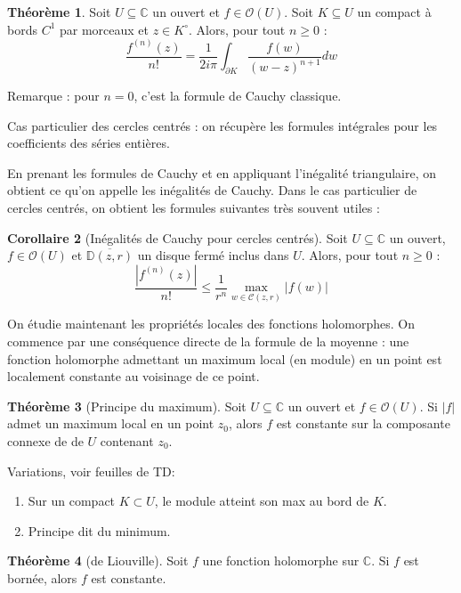 \documentclass[11pt,a4paper]{book}
\newcommand{\C}{\mathbb{C}}
\theoremstyle{definition}
\newtheorem{theoreme}{Th\'eor\`eme}[section]
\newtheorem{corollaire}[theoreme]{Corollaire}
\theoremstyle{plain}
\begin{document}
\begin{theoreme}
Soit $U\subseteq \C$ un ouvert et $f\in \mathcal O(U)$.
Soit $K\subseteq U$ un compact à bords $C^1$ par morceaux et $z\in K^\circ$.
Alors, pour tout $n\geq 0$ :
\[ \frac{f^{(n)}(z)}{n!} = \frac{1}{2i\pi} \int_{\partial K} \frac{f(w)}{(w-z)^{n+1}}dw\]
\end{theoreme}
Remarque : pour $n=0$, c'est la formule de Cauchy classique.

 Cas particulier des cercles centrés : on récupère les formules intégrales pour les coefficients des séries entières.
 
 En prenant les formules de Cauchy et en appliquant l'inégalité triangulaire, on obtient ce qu'on appelle les inégalités de Cauchy.
 Dans le cas particulier de cercles centrés, on obtient les formules suivantes très souvent utiles :
 
\begin{corollaire}[Inégalités de Cauchy pour cercles centrés]
Soit $U\subseteq \C$ un ouvert,  $f\in \mathcal O(U)$ et $\overline{\mathbb D(z,r)}$ un disque fermé inclus dans $U$.
Alors,  pour tout $n\geq 0$ :
\[ \frac{\left|f^{(n)}(z)\right|}{n!} \leq \frac{1}{r^n} \max_{w\in \mathcal C(z,r)} |f(w)|\]
\end{corollaire}
 

On étudie maintenant les propriétés locales des fonctions holomorphes.
On commence par une conséquence directe de la formule de la moyenne : une fonction holomorphe admettant un maximum local (en module) en un point est localement constante au voisinage de ce point.
 
\begin{theoreme}[Principe du maximum]
Soit $U\subseteq \C$ un ouvert et $f \in \mathcal O(U)$.
Si $|f|$ admet un maximum local en un point $z_0$, alors $f$ est constante sur la composante connexe de de $U$ contenant $z_0$.
\end{theoreme}

Variations, voir feuilles de TD:
\begin{enumerate}
\item Sur un compact $K\subset U$, le module atteint son max au bord de $K$.
\item Principe dit \og du minimum\fg.
\end{enumerate}
 
 \begin{theoreme}[de Liouville]
 Soit $f$ une fonction holomorphe sur $\C$.
 Si $f$ est bornée, alors $f$ est constante.
 \end{theoreme}
 
\end{document}
